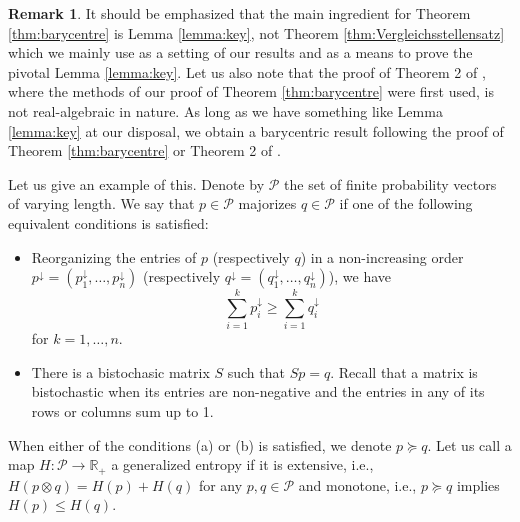 \documentclass[12pt,a4paper,reqno]{amsart}
\theoremstyle{definition}
\newtheorem{remark}[proposition]{Remark}
\newcommand{\mc}[1]{\mathcal{#1}}
\newcommand{\R}{\mathbb R}
\begin{document}
\begin{remark}
It should be emphasized that the main ingredient for Theorem \ref{thm:barycentre} is Lemma \ref{lemma:key}, not Theorem \ref{thm:Vergleichsstellensatz} which we mainly use as a setting of our results and as a means to prove the pivotal Lemma \ref{lemma:key}. Let us also note that the proof of Theorem 2 of \cite{Mu_et_al_2021}, where the methods of our proof of Theorem \ref{thm:barycentre} were first used, is not real-algebraic in nature. As long as we have something like Lemma \ref{lemma:key} at our disposal, we obtain a barycentric result following the proof of Theorem \ref{thm:barycentre} or Theorem 2 of \cite{Mu_et_al_2021}.

Let us give an example of this. Denote by $\mc P$ the set of finite probability vectors of varying length. We say that $p\in\mc P$ majorizes $q\in\mc P$ if one of the following equivalent conditions is satisfied:
\begin{itemize}
\item[(a)] Reorganizing the entries of $p$ (respectively $q$) in a non-increasing order $p^\downarrow=(p_1^\downarrow,\ldots,p^\downarrow_n)$ (respectively $q^\downarrow=(q^\downarrow_1,\ldots,q^\downarrow_n)$), we have
$$
\sum_{i=1}^k p^\downarrow_i\geq\sum_{i=1}^k q^\downarrow_i
$$
for $k=1,\ldots,n$.
\item[(b)] There is a bistochasic matrix $S$ such that $Sp=q$. Recall that a matrix is bistochastic when its entries are non-negative and the entries in any of its rows or columns sum up to 1.
\end{itemize}
When either of the conditions (a) or (b) is satisfied, we denote $p\succeq q$. Let us call a map $H:\mc P\to\R_+$ a generalized entropy if it is extensive, i.e., $H(p\otimes q)=H(p)+H(q)$ for any $p,q\in\mc P$ and monotone, i.e., $p\succeq q$ implies $H(p)\leq H(q)$.


\end{remark}
\end{document}

